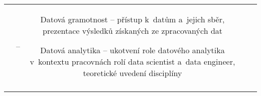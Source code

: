 \begin{landscape}
\begin{table}[htbp]
{\begin{tabularx}{\linewidth}{CCCCC}
&

–

&

Datová gramotnost – přístup k~datům a~jejich sběr, prezentace výsledků získaných ze zpracovaných dat

Datová analytika – ukotvení role datového analytika v~kontextu pracovnách rolí data scientist a~data engineer, teoretické uvedení disciplíny  

\\

\tabularnewline
\bottomrule
\end{tabularx}

}

\end{table}

\end{landscape}